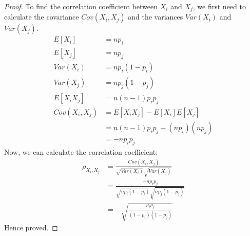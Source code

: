 \documentclass[openany]{book}
\begin{document}
\begin{proof}
To find the correlation coefficient between $X_i$ and $X_j$, we first need to calculate the covariance $Cov(X_i, X_j)$ and the variances $Var(X_i)$ and $Var(X_j)$.
\begin{align*}
    E[X_i] &= np_i \\
    E[X_j] &= np_j \\
    Var(X_i) &= np_i(1 - p_i) \\
    Var(X_j) &= np_j(1 - p_j) \\
    E[X_i X_j] &= n(n - 1)p_i p_j \\
    Cov(X_i, X_j) &= E[X_i X_j] - E[X_i]E[X_j] \\
    &= n(n - 1)p_i p_j - (np_i)(np_j) \\
    &= -np_i p_j
\end{align*}
Now, we can calculate the correlation coefficient:
\begin{align*}
    \rho_{X_i, X_j} &= \frac{Cov(X_i, X_j)}{\sqrt{Var(X_i)} \sqrt{Var(X_j)}} \\
    &= \frac{-np_i p_j}{\sqrt{np_i(1 - p_i)} \sqrt{np_j(1 - p_j)}} \\
    &= -\sqrt{\frac{p_i p_j}{(1 - p_i)(1 - p_j)}}
\end{align*}
Hence proved.
\end{proof}
\end{document}
